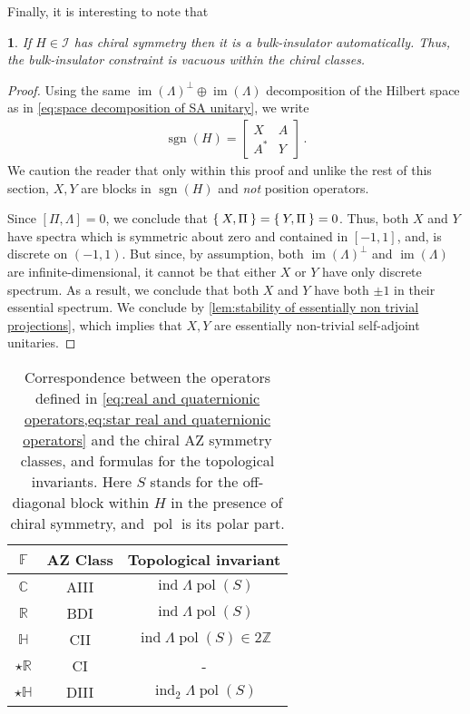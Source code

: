 \documentclass[a4paper,10pt]{article}
\numberwithin{equation}{section}
\theoremstyle{plain}
\theoremstyle{plain}
\newtheorem{lem}[thm]{\protect\lemmaname}
\theoremstyle{plain}
\theoremstyle{plain}
\theoremstyle{plain}
\theoremstyle{remark}
\theoremstyle{definition}
\theoremstyle{plain}
\providecommand{\lemmaname}{Lemma}
\newcommand{\ZZ}{\mathbb{Z}}
\newcommand{\RR}{\mathbb{R}}
\newcommand{\CC}{\mathbb{C}}
\newcommand{\FF}{\mathbb{F}}
\newcommand{\calI}{\mathcal{I}}
\newcommand{\bbLambda}{\mathbb{\Lambda}}
\newcommand{\HH}{\mathbb{H}}
\newcommand{\sgn}{\operatorname{sgn}}
\newcommand{\findex}{\operatorname{ind}}
\newcommand{\im}{\operatorname{im}}
\newcommand{\eq}[1]{\begin{align*}#1\end{align*}}
\newcommand{\polar}{\operatorname{pol}}
\begin{document}
	Finally, it is interesting to note that 
	\begin{lem}\label{lem:chiral insulators are automatically bulk non trivial}
		If $H\in\calI$ has chiral symmetry then it is a bulk-insulator automatically. Thus, the bulk-insulator constraint is vacuous within the chiral classes.
	\end{lem}
	\begin{proof}
		Using the same $\im(\Lambda)^\perp\oplus\im(\Lambda)$ decomposition of the Hilbert space as in \cref{eq:space decomposition of SA unitary}, we write \eq{\sgn(H) = \begin{bmatrix}X & A \\ A^\ast & Y\end{bmatrix}\,.} We caution the reader that only within this proof and unlike the rest of this section, $X,Y$ are blocks in $\sgn(H)$ and \emph{not} position operators. 
		
		Since $[\Pi,\Lambda]=0$, we conclude that $\Set{X,\Pi}=\Set{Y,\Pi}=0$. Thus, both $X$ and $Y$ have spectra which is symmetric about zero and contained in $[-1,1]$, and, is discrete on $(-1,1)$. But since, by assumption, both $\im(\Lambda)^\perp$ and $\im(\Lambda)$ are infinite-dimensional, it cannot be that either $X$ or $Y$ have only discrete spectrum. As a result, we conclude that both $X$ and $Y$ have both $\pm1$ in their essential spectrum. We conclude by \cref{lem:stability of essentially non trivial projections}, which implies that $X,Y$ are essentially non-trivial self-adjoint unitaries.
		
	\end{proof}
	
	\begin{table}
		\begin{center}
			\begin{tabular}{|c|c|c|}
				\hline
				$\FF$ & AZ Class & Topological invariant \\\hline\hline
				$\CC$ & AIII & $\findex\bbLambda\polar(S)$ \\\hline
				$\RR$ & BDI & $\findex\bbLambda\polar(S)$ \\\hline
				$\HH$ & CII&$\findex\bbLambda\polar(S)\in2\ZZ$ \\\hline
				$\star\RR$ & CI&-\\\hline
				$\star\HH$ & DIII&$\findex_2\bbLambda\polar(S)$ \\\hline
			\end{tabular}
		\end{center}
		\caption{Correspondence between the operators defined in \cref{eq:real and quaternionic operators,eq:star real and quaternionic operators} and the chiral AZ symmetry classes, and formulas for the topological invariants. Here $S$ stands for the off-diagonal block within $H$ in the presence of chiral symmetry, and $\polar$ is its polar part.}
		\label{table:AZ chiral classes and symmetries of unitaries}
	\end{table}
	
\end{document}
